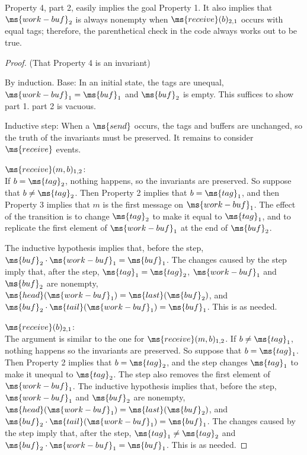 Property 4, part 2, easily implies the goal Property 1.
It also implies that $\ms{work-buf}_2$ is always nonempty when 
$\ms{receive}(b)_{2,1}$ occurs with equal tags; therefore, the
parenthetical check in the code always works out to be true.

\begin{proof}
(That Property 4 is an invariant)

By induction. 
Base: In an initial state, the tags are unequal, 
$\ms{work-buf}_1 = \ms{buf}_1$ and $\ms{buf}_2$ is empty.  This
suffices to show part 1.  part 2 is vacuous.

Inductive step:
When a $\ms{send}$ occurs, the tags and buffers are unchanged, so the
truth of the invariants must be preserved. 
It remains to consider $\ms{receive}$ events.

$\ms{receive}(m,b)_{1,2}$: \\
If $b = \ms{tag}_2$, nothing happens, so the invariants are preserved.
So suppose that $b \neq \ms{tag}_2$.
Then Property 2 implies that $b = \ms{tag}_1$,
and then Property 3 implies that $m$ is the first message on
$\ms{work-buf}_1$.
The effect of the transition is to change $\ms{tag}_2$ to make it
equal to $\ms{tag}_1$, and to replicate the first element of
$\ms{work-buf}_1$ at the end of $\ms{buf}_2$. 

The inductive hypothesis implies that, before the step,
$\ms{buf}_2 \cdot \ms{work-buf}_1 = \ms{buf}_1$.
The changes caused by the step imply that, after the step,
$\ms{tag}_1 = \ms{tag}_2$,
$\ms{work-buf}_1$ and $\ms{buf}_2$ are nonempty, 
$\ms{head}(\ms{work-buf}_1) = \ms{last}(\ms{buf}_2)$, and 
$\ms{buf}_2 \cdot \ms{tail}(\ms{work-buf}_1) = \ms{buf}_1$. 
This is as needed.

$\ms{receive}(b)_{2,1}$: \\
The argument is similar to the one for $\ms{receive}(m,b)_{1,2}$.
If $b \neq \ms{tag}_1$, nothing happens so the invariants are
preserved.
So suppose that $b = \ms{tag}_1$.
Then Property 2 implies that $b = \ms{tag}_2$, and the 
step changes $\ms{tag}_1$ to make it unequal to $\ms{tag}_2$.
The step also removes the first element of $\ms{work-buf}_1$.
The inductive hypothesis implies that, before the step,
$\ms{work-buf}_1$ and $\ms{buf}_2$ are nonempty, 
$\ms{head}(\ms{work-buf}_1) = \ms{last}(\ms{buf}_2)$, and 
$\ms{buf}_2 \cdot \ms{tail}(\ms{work-buf}_1) = \ms{buf}_1$.
The changes caused by the step imply that, after the step,
$\ms{tag}_1 \neq \ms{tag}_2$ and 
$\ms{buf}_2 \cdot \ms{work-buf}_1 = \ms{buf}_1$.
This is as needed.
\end{proof}

